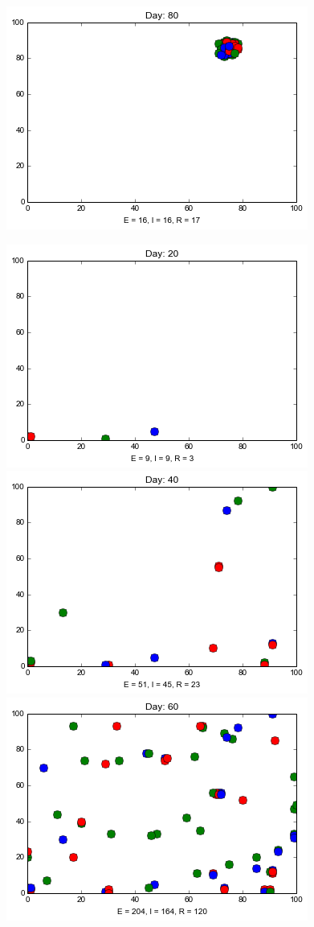 \begin{figure}[h]
\includegraphics[scale=0.28]{images/1t80.png} 

\medskip
\includegraphics[scale=0.28]{images/3t20.png} \quad
\includegraphics[scale=0.28]{images/3t40.png} \quad
\includegraphics[scale=0.28]{images/3t60.png} \quad

\end{figure}
